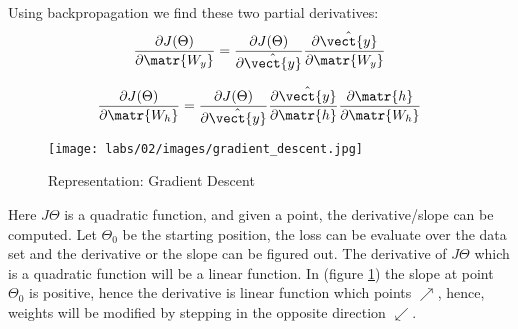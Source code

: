 Using backpropagation we find these two partial derivatives:
\[
    \frac{\partial J(\Theta)}{\partial \matr{W_y}} = 
    \frac{\partial J(\Theta)}{\partial \hat{\vect{y}}}
    \frac{\partial \hat{\vect{y}}}{\partial \matr{W_y}}
\]
    
\[\frac{\partial J(\Theta)}{\partial \matr{W_h}} =
\frac{\partial J(\Theta)}{\partial \hat{\vect{y}}}
\frac{\partial \hat{\vect{y}}}{\partial \matr{h}}
\frac{\partial \matr{h}}{\partial \matr{W_h}}
\]


\begin{figure}[ht]
    \centering
    \texttt{[image: labs/02/images/gradient\_descent.jpg]}
    \caption{Representation: Gradient Descent}
    \label{fig:gradient_descent}
\end{figure}

Here $J{\Theta}$ is a  quadratic function, and given a point, the derivative/slope can be computed. Let $\Theta_0$ be the starting position, the loss can be evaluate over the data set and the derivative or the slope can be figured out. The derivative of $J{\Theta}$ which is a quadratic function will be a linear function. In (figure \ref{fig:gradient_descent}) the slope at point $\Theta_0$ is positive, hence the derivative is linear function which points $\nearrow$, hence, weights will be modified by stepping in the opposite direction $\swarrow$.




